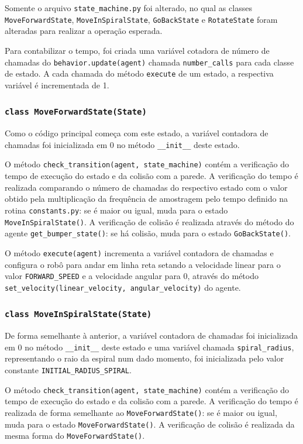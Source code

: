 \documentclass[brazil, 12pt]{article}
\begin{document}
Somente o arquivo \verb|state_machine.py| foi alterado, no qual as classes \verb|MoveForwardState|, \verb|MoveInSpiralState|, \verb|GoBackState| e \verb|RotateState| foram alteradas para realizar a operação esperada.

Para contabilizar o tempo, foi criada uma variável cotadora de número de chamadas do \texttt{behavior.update(agent)} chamada \texttt{number\_calls} para cada classe de estado. A cada chamada do método \texttt{execute} de um estado, a respectiva variável é incrementada de 1.

\subsubsection{\texttt{class MoveForwardState(State)}}
Como o código principal começa com este estado, a variável contadora de chamadas foi inicializada em 0 no método \texttt{\_\_init\_\_} deste estado.

O método \texttt{check\_transition(agent, state\_machine)} contém a verificação do tempo de execução do estado e da colisão com a parede. A verificação do tempo é realizada comparando o número de chamadas do respectivo estado com o valor obtido pela multiplicação da frequência de amostragem pelo tempo definido na rotina \texttt{constants.py}: se é maior ou igual, muda para o estado \texttt{MoveInSpiralState()}. A verificação de colisão é realizada através do método do agente \texttt{get\_bumper\_state()}: se há colisão, muda para o estado \texttt{GoBackState()}.

O método \texttt{execute(agent)} incrementa a variável contadora de chamadas e configura o robô para andar em linha reta setando a velocidade linear para o valor \texttt{FORWARD\_SPEED} e a velocidade angular para 0, através do método \texttt{set\_velocity(linear\_velocity, angular\_velocity)} do agente.

\subsubsection{\texttt{class MoveInSpiralState(State)}}
De forma semelhante à anterior, a variável contadora de chamadas foi inicializada em 0 no método \texttt{\_\_init\_\_} deste estado e uma variável chamada \texttt{spiral\_radius}, representando o raio da espiral num dado momento, foi inicializada pelo valor constante \texttt{INITIAL\_RADIUS\_SPIRAL}.

O método \texttt{check\_transition(agent, state\_machine)} contém a verificação do tempo de execução do estado e da colisão com a parede. A verificação do tempo é realizada de forma semelhante ao \texttt{MoveForwardState()}: se é maior ou igual, muda para o estado \texttt{MoveForwardState()}. A verificação de colisão é realizada da mesma forma do \texttt{MoveForwardState()}.
\end{document}
